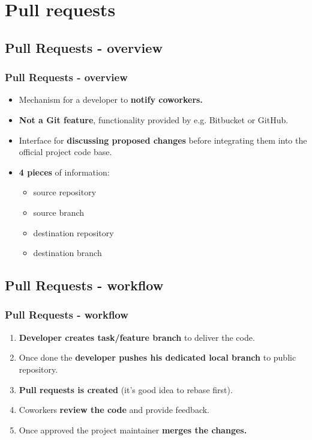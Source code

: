 \section[Pull requests]{Pull requests}
\subsection[]{Pull Requests - overview}
\begin{frame}
\frametitle{Pull Requests - overview}
\begin{itemize}
	\item Mechanism for a developer to \textbf{notify coworkers.}
	\item \textbf{Not a Git feature}, functionality provided by e.g. Bitbucket or GitHub.
	\item Interface for \textbf{discussing proposed changes} before integrating them into the official project code base.
	\item \textbf{4 pieces} of information:
		\begin{itemize} 
		\item source repository
		\item source branch
		\item destination repository
		\item destination branch
		\end{itemize}
\end{itemize}
\end{frame}

\subsection[]{Pull Requests - workflow}
\begin{frame}
\frametitle{Pull Requests - workflow}
\begin{enumerate}
	\item \textbf{Developer creates task/feature branch} to deliver the code.
	\item Once done the \textbf{developer pushes his dedicated local branch} to public repository.
	\item \textbf{Pull requests is created} (it’s good idea to rebase first).
	\item Coworkers \textbf{review the code} and provide feedback.
	\item Once approved the project maintainer \textbf{merges the changes.}
\end{enumerate}
\end{frame}


 

